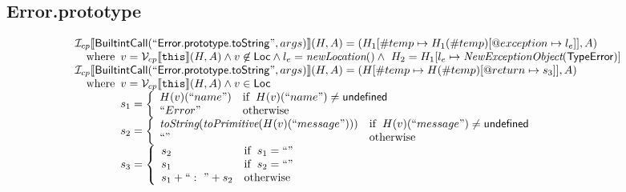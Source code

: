 \subsection{Error.prototype}
\[
\begin{array}{l}

\I _{cp}\lbr \SF{BuiltintCall}(``\SF{Error.prototype.toString}",args)\rbr(H,A)
  = (H_1[\#temp \mapsto H_1(\#temp)[@exception \mapsto l_e]], A)\\
\quad\wherec{
  v = \V _{cp}\lbr \TT{this}\rbr (H,A) \land v \not\in \SF{Loc}
  \land l_e = \hf{newLocation}() \land\ H_2=H_1[l_e\mapsto\hf{NewExceptionObject}(\SF{TypeError})] 
  }\\

\I _{cp}\lbr \SF{BuiltintCall}(``\SF{Error.prototype.toString}",args)\rbr(H,A)
  = (H[\#temp \mapsto H(\#temp)[@return \mapsto s_3]], A)\\
\quad\wherec{
  v = \V _{cp}\lbr \TT{this}\rbr (H,A) \land v \in \SF{Loc}\\
  s_1 = \left\{\begin{array}{ll}
    H(v)(``name") & \ifc{H(v)(``name") \neq \SF{undefined}}\\
    ``Error" & \owc \\
    \end{array}\right.\\
  s_2 = \left\{\begin{array}{ll}
    \hf{toString}(\hf{toPrimitive}(H(v)(``message"))) & \ifc{H(v)(``message") \neq \SF{undefined}}\\
    ``" & \owc \\
    \end{array}\right.\\
  s_3 = \left\{\begin{array}{ll}
    s_2 & \ifc{s_1 = ``"}\\
    s_1 & \ifc{s_2 = ``"} \\
    s_1 + ``:\ " + s_2& \owc
    \end{array}\right.
  }\\
\\

\end{array}
\]



